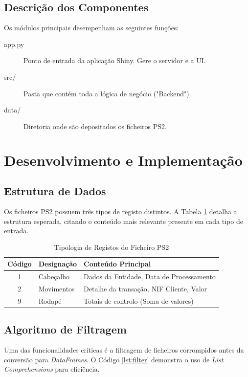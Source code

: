 \documentclass[12pt, a4paper]{article}
\begin{document}
\subsection{Descrição dos Componentes}
Os módulos principais desempenham as seguintes funções:

\begin{description} %
    \item[app.py] Ponto de entrada da aplicação Shiny. Gere o servidor e a UI.
    \item[src/] Pasta que contém toda a lógica de negócio ("Backend").
    \item[data/] Diretoria onde são depositados os ficheiros PS2.
\end{description}

\section{Desenvolvimento e Implementação}

\subsection{Estrutura de Dados}
Os ficheiros PS2 possuem três tipos de registo distintos. A Tabela \ref{tab:registos} detalha a estrutura esperada, citando o conteúdo mais relevante presente em cada tipo de entrada.

\begin{table}[H]
    \centering
    \caption{Tipologia de Registos do Ficheiro PS2}
    \label{tab:registos}
    \begin{tabular}{cll}
        \toprule
        \textbf{Código} & \textbf{Designação} & \textbf{Conteúdo Principal} \\
        \midrule
        1 & Cabeçalho & Dados da Entidade, Data de Processamento \\
        2 & Movimentos & Detalhe da transação, NIF Cliente, Valor \\
        9 & Rodapé & Totais de controlo (Soma de valores) \\
        \bottomrule
    \end{tabular}
\end{table}

\subsection{Algoritmo de Filtragem}
Uma das funcionalidades críticas é a filtragem de ficheiros corrompidos antes da conversão para \textit{DataFrames}. O Código \ref{lst:filter} demonstra o uso de \textit{List Comprehensions} para eficiência.
\end{document}
